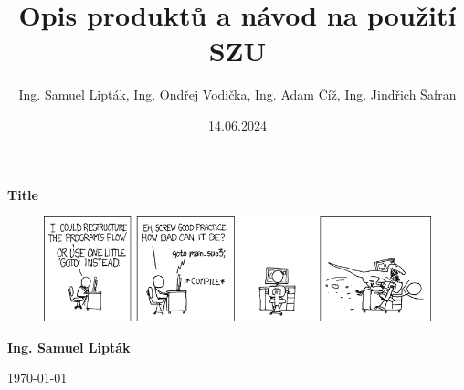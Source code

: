 \title{Opis produktů a návod na použití SZU}
\date{14.06.2024}
\author{Ing. Samuel Lipták, Ing. Ondřej Vodička, Ing. Adam Číž, Ing. Jindřich Šafran}

\thispagestyle{empty} %

\begin{center}
    \vfill
    \vspace{2cm}
    \textbf{\Huge{Title}}

    \vfill

    \begin{figure}[ht!]
        \centering
        \includegraphics[width=1\textwidth]{figures/document_title_logo.png}
    \end{figure}
    \vfill

    \vspace{1cm}

    \hfill
    \begin{flushright}
        \textbf{\large{Ing. Samuel Lipták}}

        \large{\today}
    \end{flushright}

\end{center}

\newpage

